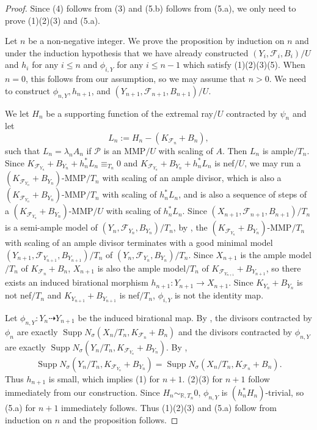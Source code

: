 \documentclass[11pt]{amsart}
\numberwithin{equation}{section}
\newcommand{\Supp}{\operatorname{Supp}}
\newcommand{\Ff}{\mathcal{F}}
\theoremstyle{definition}
\theoremstyle{definition}
\theoremstyle{definition}
\begin{document}
\begin{proof}
Since (4) follows from (3) and (5.b) follows from (5.a), we only need to prove (1)(2)(3) and (5.a).

Let $n$ be a non-negative integer. We prove the proposition by induction on $n$ and under the induction hypothesis that we have already constructed $(Y_i,\Ff_i,B_i)/U$ and $h_i$ for any $i\leq n$ and $\phi_{i,Y}$ for any $i\leq n-1$ which satisfy (1)(2)(3)(5). When $n=0$, this follows from our assumption, so we may assume that $n>0$. We need to construct $\phi_{n,Y},h_{n+1}$, and $(Y_{n+1},\Ff_{n+1},B_{n+1})/U$.

We let $H_n$ be a supporting function of the extremal ray$/U$ contracted by $\psi_n$ and let  
$$L_n:=H_n-(K_{\Ff_n}+B_n),$$
such that $L_n=\lambda_nA_n$ if $\mathcal{P}$ is an MMP$/U$ with scaling of $A$. Then $L_n$ is ample$/T_n$. Since $K_{\Ff_{Y_n}}+B_{Y_n}+h_n^*L_n\equiv_{T_n}0$ and $K_{\Ff_{Y_n}}+B_{Y_n}+h_n^*L_n$ is nef$/U$, we may run a $(K_{\Ff_{Y_n}}+B_{Y_n})$-MMP$/T_n$ with scaling of an ample divisor, which is also a $(K_{\Ff_{Y_n}}+B_{Y_n})$-MMP$/T_n$ with scaling of $h_n^*L_n$, and is also a sequence of steps of a $(K_{\Ff_{Y_n}}+B_{Y_n})$-MMP$/U$ with scaling of $h_n^*L_n$. Since $(X_{n+1},\Ff_{n+1},B_{n+1})/T_n$ is a semi-ample model of $(Y_{n},\Ff_{Y_n},B_{Y_n})/T_n$, by \cite[Theorem 1.11]{LMX24b}, the  $(K_{\Ff_{Y_n}}+B_{Y_n})$-MMP$/T_n$ with scaling of an ample divisor terminates with a good minimal model $(Y_{n+1},\Ff_{Y_{n+1}},B_{Y_{n+1}})/T_n$ of $(Y_{n},\Ff_{Y_{n}},B_{Y_{n}})/T_n$. Since $X_{n+1}$ is the ample model$/T_n$ of $K_{\Ff_n}+B_n$, $X_{n+1}$ is also the ample model$/T_n$ of $K_{\Ff_{Y_{n+1}}}+B_{Y_{n+1}}$, so there exists an induced birational morphism $h_{n+1}: Y_{n+1}\rightarrow X_{n+1}$. Since $K_{Y_n}+B_{Y_n}$ is not nef$/T_n$ and $K_{Y_{n+1}}+B_{Y_{n+1}}$ is nef$/T_n$, $\phi_{i,Y}$ is not the identity map.

Let $\phi_{n,Y}: Y_n\dashrightarrow Y_{n+1}$ be the induced birational map. By \cite[Lemma 2.25]{LMX24b}, the divisors contracted by $\phi_n$ are exactly $\Supp N_{\sigma}(X_n/T_n,K_{\Ff_n}+B_n)$ and the divisors contracted by $\phi_{n,Y}$ are exactly $\Supp N_{\sigma}(Y_n/T_n,K_{\Ff_{Y_n}}+B_{Y_n})$. By \cite[Lemma 3.4(2)(3)]{LX23a}, 
$$\Supp N_{\sigma}(Y_n/T_n,K_{\Ff_{Y_n}}+B_{Y_n})=\Supp N_{\sigma}(X_n/T_n,K_{\Ff_n}+B_n).$$
Thus $h_{n+1}$ is small, which implies (1) for $n+1$. (2)(3) for $n+1$ follow immediately from our construction. Since $H_n\sim_{\mathbb R,T_n}0$, $\phi_{n,Y}$ is $(h_n^*H_n)$-trivial, so (5.a) for $n+1$ immediately follows. Thus (1)(2)(3) and (5.a) follow from induction on $n$ and the proposition follows.
\end{proof}
\end{document}
